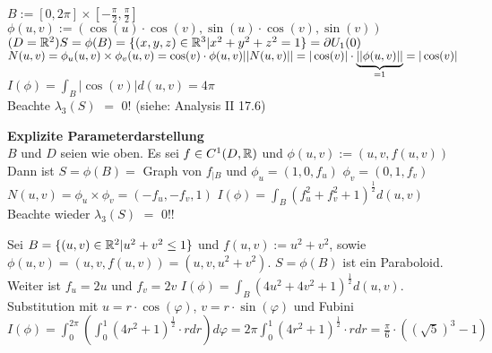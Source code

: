 \documentclass{article}
\begin{document}
\begin{beispiele}
\item
$B := [0,2\pi] \times [-\frac\pi2, \frac\pi2]$ \\
$\phi(u,v) := (\cos(u)\cdot \cos(v), \sin(u)\cdot \cos(v), \sin(v))$  $(D = \mathbb{R}^2) \\
S = \phi(B) = \{ (x,y,z) \in \mathbb{R}^3 | x^2 +y^2 +z^2 = 1 \} = \partial U_1(0)$\\
$N(u,v) = \phi_u(u,v) \times \phi_v(u,v) = \cos(v)\cdot \phi(u,v) \\
|| N(u,v) || = | \cos (v) | \cdot  \underbrace{|| \phi(u,v) ||}_{=1} = | \cos(v) |$ \\
\folgt $I(\phi) = \int_{B} | \cos (v) | d(u,v) = 4\pi$ \\
Beachte $\lambda_3(S)$ $=$ $0$! (siehe: Analysis II 17.6)

\item \textbf{Explizite Parameterdarstellung} \\
$B$ und $D$ seien wie oben. Es sei $f \in C^1(D,\mathbb{R})$ und $\phi(u,v) := (u,v,f(u,v))$ \\
Dann ist $ S = \phi(B) = $ Graph von $f_{|B}$ und $\phi_u = (1,0,f_u)$ $\phi_v = (0,1,f_v)$ \folgt $N(u,v) = \phi_u \times \phi_v = (-f_u, -f_v, 1)$ \folgt $I(\phi) = \int_{B} (f_{u}^2 + f_{v}^2 +1)^{\frac12} d(u,v)$ \\
Beachte wieder $\lambda_3(S)$ $=$ $0$!!


\item
Sei $B = \{(u,v) \in \mathbb{R}^2 | u^2 + v^2 \le 1 \}$ und $f(u,v) := u^2  + v^2$, sowie $\phi(u,v) = (u,v, f(u,v)) = (u,v, u^2 + v^2)$.
$S = \phi(B)$ ist ein Paraboloid. Weiter ist $f_u = 2u$ und $f_v = 2v$ \folgt $I(\phi) = \int_{B} (4u^2+4v^2+1)^{\frac12} d(u,v)$. \\
Substitution mit $u = r\cdot \cos(\varphi)$, $v = r\cdot \sin(\varphi)$ und Fubini \folgt 
$I(\phi) = \int_{0}^{2\pi} ( \int_0^1 (4r^2 +1)^{\frac12}\cdot r dr) d \varphi = 2\pi \int_0^1 (4r^2 +1)^{\frac12}\cdot r dr = \frac\pi6 \cdot  ((\sqrt{5})^3-1)$

\end{beispiele}
\end{document}
